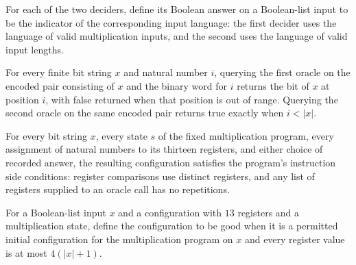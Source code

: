 \begin{definition}
\label{Complexity.multOracle}
\leanok
{}
For each of the two deciders, define its Boolean answer on a Boolean-list input to be
the indicator of the corresponding input language: the first decider uses the language
of valid multiplication inputs, and the second uses the language of valid input lengths.
\end{definition}

\begin{lemma}
\label{Complexity.mult_queries}
\leanok
{}
For every finite bit string $x$ and natural number $i$, querying the first oracle on the
encoded pair consisting of $x$ and the binary word for $i$ returns the bit of $x$ at
position $i$, with false returned when that position is out of range. Querying the
second oracle on the same encoded pair returns true exactly when $i<|x|$.
\end{lemma}

\begin{lemma}
\label{Complexity.mult_preconditions}
\leanok
{}
For every bit string $x$, every state $s$ of the fixed multiplication program, every
assignment of natural numbers to its thirteen registers, and either choice of recorded
answer, the resulting configuration satisfies the program's instruction side conditions:
register comparisons use distinct registers, and any list of registers supplied to an
oracle call has no repetitions.
\end{lemma}

\begin{definition}
\label{Complexity.MultGood}
\leanok
{}
For a Boolean-list input $x$ and a configuration with $13$ registers and a
multiplication state, define the configuration to be good when it is a permitted initial
configuration for the multiplication program on $x$ and every register value is at most
$4(|x|+1)$.
\end{definition}

